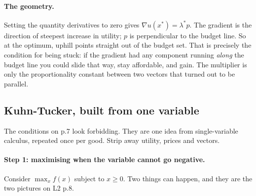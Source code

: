 \documentclass[11pt]{article}
\theoremstyle{definition}
\newcommand{\xs}{x^*}
\begin{document}
\paragraph{The geometry.} Setting the quantity derivatives to zero gives
$\nabla u(\xs)=\lambda^*p$. The gradient is the direction of steepest increase in utility;
$p$ is perpendicular to the budget line. So at the optimum, uphill points straight out of
the budget set. That is precisely the condition for being stuck: if the gradient had any
component running \emph{along} the budget line you could slide that way, stay affordable,
and gain. The multiplier is only the proportionality constant between two vectors that
turned out to be parallel.

\begin{center}
\end{center}

\subsection{Kuhn-Tucker, built from one variable}

The conditions on p.7 look forbidding. They are one idea from single-variable calculus,
repeated once per good. Strip away utility, prices and vectors.

\paragraph{Step 1: maximising when the variable cannot go negative.} Consider
$\max_x f(x)$ subject to $x\ge0$. Two things can happen, and they are the two pictures on
L2 p.8.
\end{document}
